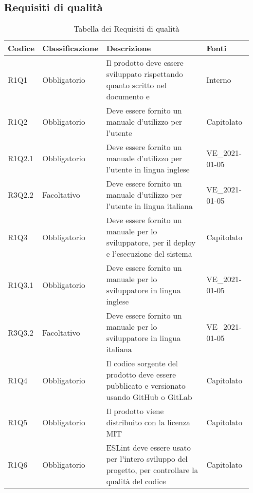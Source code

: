 \subsection{Requisiti di qualità}

{


\centering
\renewcommand{\arraystretch}{2}
\begin{longtable}{C{2.5cm} C{2.8cm} C{6.7cm} C{2.5cm}}
\caption{Tabella dei Requisiti di qualità}\\
\textbf{Codice} &
\textbf{Classificazione}&
\textbf{Descrizione}&
\textbf{Fonti}\\
\endhead


R1Q1 & Obbligatorio & Il prodotto deve essere sviluppato rispettando quanto scritto nel documento  e  & Interno \\
R1Q2 & Obbligatorio & Deve essere fornito un manuale d'utilizzo per l'utente & Capitolato \\
R1Q2.1 & Obbligatorio & Deve essere fornito un manuale d'utilizzo per l'utente in lingua inglese & VE\_2021-01-05 \\
R3Q2.2 & Facoltativo & Deve essere fornito un manuale d'utilizzo per l'utente in lingua italiana & VE\_2021-01-05 \\
R1Q3 & Obbligatorio & Deve essere fornito un manuale per lo sviluppatore, per il deploy e l'esecuzione del sistema & Capitolato \\
R1Q3.1 & Obbligatorio & Deve essere fornito un manuale per lo sviluppatore in lingua inglese & VE\_2021-01-05 \\
R3Q3.2 & Facoltativo & Deve essere fornito un manuale per lo sviluppatore in lingua italiana & VE\_2021-01-05 \\
R1Q4 & Obbligatorio & Il codice sorgente del prodotto deve essere pubblicato e versionato usando GitHub o GitLab & Capitolato \\
R1Q5 & Obbligatorio & Il prodotto viene distribuito con la licenza MIT & Capitolato \\
R1Q6 & Obbligatorio & ESLint deve essere usato per l'intero sviluppo del progetto, per controllare la qualità del codice & Capitolato \\

\end{longtable}

}